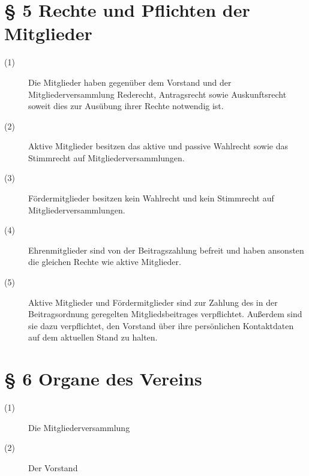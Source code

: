 \documentclass[a4paper,12pt]{scrartcl}
\begin{document}
\section*{\S{} 5 Rechte und Pflichten der Mitglieder}
\begin{description} 

\item[(1)] Die Mitglieder haben gegenüber dem Vorstand und der Mitgliederversammlung Rederecht, Antragsrecht sowie Auskunftsrecht soweit dies zur Ausübung ihrer Rechte notwendig ist. 
\item[(2)] Aktive Mitglieder besitzen das aktive und passive Wahlrecht sowie das Stimmrecht auf Mitgliederversammlungen.
\item[(3)] Fördermitglieder besitzen kein Wahlrecht und kein Stimmrecht auf Mitgliederversammlungen.
\item[(4)] Ehrenmitglieder sind von der Beitragszahlung befreit und haben ansonsten die gleichen Rechte wie aktive Mitglieder.
\item[(5)] Aktive Mitglieder und Fördermitglieder sind zur Zahlung des in der Beitragsordnung geregelten Mitgliedsbeitrages verpflichtet. Außerdem sind sie dazu verpflichtet, den Vorstand über ihre persönlichen Kontaktdaten auf dem aktuellen Stand zu halten.

\end{description}



\section*{\S{} 6 Organe des Vereins}
\begin{description} 

\item[(1)] Die Mitgliederversammlung
\item[(2)] Der Vorstand

\end{description}
\end{document}
